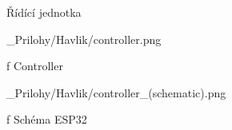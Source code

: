 \app Řídící jednotka

\medskip {}
\picw=10cm _Prilohy/Havlik/controller.png
\caption/f Controller
\medskip

\medskip {}
\picw=15cm _Prilohy/Havlik/controller_(schematic).png
\caption/f Schéma ESP32
\medskip

\par